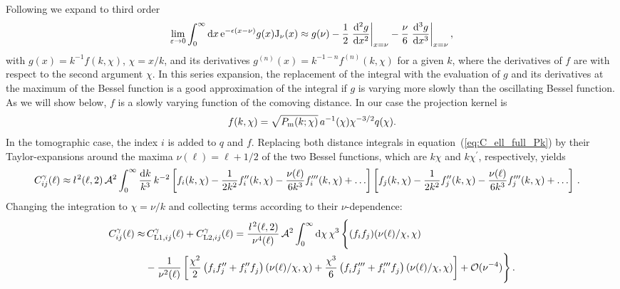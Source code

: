 \documentclass[fleqn,usenatbib]{mnras} %
\newcommand{\ellbar}{\hbox{\it \l}\,}
\newcommand{\pref}{{\cal A}}
\begin{document}
Following \cite{2008PhRvD..78l3506L} we expand to third order
%
\begin{equation}
  \lim_{\varepsilon \rightarrow 0} \int_0^\infty {\rm d} x \, {\rm e}^{-\epsilon (x - \nu)} g(x) {\rm J}_\nu(x)
  \approx g(\nu) - \frac 1 2 \left.\frac{{\rm d}^2 g}{{\rm d} x^2}\right|_{x=\nu}
                 - \frac \nu 6 \left.\frac{{\rm d}^3 g}{{\rm d} x^3}\right|_{x=\nu},
\end{equation}
%
with $g(x) = k^{-1} f(k, \chi)$, $\chi=x/k$, and its derivatives $g^{(n)}(x) =
k^{-1-n} f^{(n)}(k, \chi)$ for a given $k$, where the derivatives of $f$
are with respect to the second argument $\chi$. In this series expansion, the
replacement of the integral with the evaluation of $g$ and its derivatives at
the maximum of the Bessel function is a good approximation of the integral if
$g$ is varying more slowly than the oscillating Bessel function.
As we will show below, $f$ is a slowly varying function of the comoving
distance. In our case the projection kernel is
%
\begin{equation}
  f(k, \chi) = \sqrt{P_{\rm m}(k; \chi)} \, a^{-1}(\chi) \chi^{-3/2} q(\chi).
  \label{eq:f_LA08}
\end{equation}
%
In the tomographic case, the index $i$ is added to $q$ and $f$.
%
Replacing both distance integrals in equation~(\ref{eq:C_ell_full_Pk}) by their
Taylor-expansions around the maxima $\nu(\ell) = \ell + 1/2$ of the two Bessel
functions, which are $k \chi$ and $k \chi^\prime$, respectively, yields
%
\begin{align}
  C^\gamma_{ij}(\ell) \approx & \, \ellbar^2(\ell, 2) \, \pref^2
    \int_0^\infty \frac{{\rm d} k}{k^3} \, k^{-2}
    \left[ f_i(k, \chi) - \frac{1}{2 k^2} f_i^{\prime\prime}(k, \chi)
      - \frac{\nu(\ell)}{6 k^3} f_i^{\prime\prime\prime}(k, \chi) + \ldots \right]
    \left[ f_j(k, \chi) - \frac{1}{2 k^2} f_j^{\prime\prime}(k, \chi)
    - \frac{\nu(\ell)}{6 k^3} f_j^{\prime\prime\prime}(k, \chi) + \ldots \right] \, .
  \label{eq:C_ell_limber2_dk}
\end{align}
%
Changing the integration to $\chi = \nu/k$ and collecting terms according to their $\nu$-dependence:
%
\begin{align}
  C^\gamma_{ij}(\ell) \approx & \, C^\gamma_{{\rm L1}, ij}(\ell) + C^\gamma_{{\rm L2}, ij}(\ell)
    = %
    \frac{\ellbar^2(\ell, 2)}{\nu^4(\ell)} \, \pref^2
    \int_0^\infty {\rm d} \chi \, \chi^3 \, %
    \Bigg\{
    (f_i f_j)(\nu(\ell)/\chi, \chi)
      \nonumber \\
    &
     - \frac 1 {\nu^2(\ell)}
    \left[ \frac{\chi^2}{2} \left( f^{}_i f^{\prime\prime}_j + f_i^{\prime\prime} f^{}_j \right)(\nu(\ell)/\chi, \chi)
     + \frac{\chi^3}{6} \left( f^{}_i f^{\prime\prime\prime}_j + f^{\prime\prime\prime}_i f^{}_j \right)(\nu(\ell)/\chi, \chi)
    \right]
    + {\cal O}(\nu^{-4})
    \Bigg\}
    \, .
  \label{eq:C_ell_limber12_dr}
\end{align}
\end{document}
